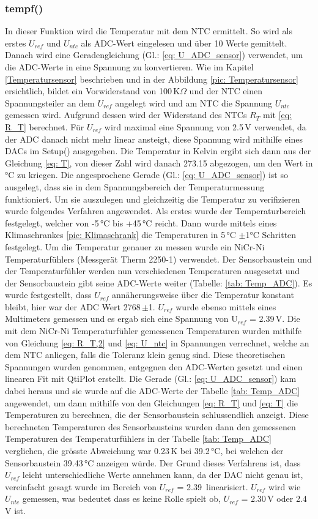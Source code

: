 \subsubsection{tempf()} \label{tempf}
In dieser Funktion wird die Temperatur mit dem NTC ermittelt. So wird als erstes $U_{ref}$ und $U_{ntc}$ als ADC-Wert eingelesen und über 10 Werte gemittelt. Danach wird eine Geradengleichung (Gl.: \ref{eq: U_ADC_sensor}) verwendet, um die ADC-Werte in eine Spannung zu konvertieren. Wie im Kapitel \ref{Temperatursensor} beschrieben und in der Abbildung \ref{pic: Temperatursensor} ersichtlich, bildet ein Vorwiderstand von 100\,K$\Omega$ und der NTC einen Spannungsteiler an dem $U_{ref}$ angelegt wird und am NTC die Spannung $U_{ntc}$ gemessen wird. Aufgrund dessen wird der Widerstand des NTCs $R_T$ mit \ref{eq: R_T} berechnet. Für $U_{ref}$ wird maximal eine Spannung von 2.5\,V verwendet, da der ADC danach nicht mehr linear ansteigt, diese Spannung wird mithilfe eines DACs im Setup() ausgegeben. Die Temperatur in Kelvin ergibt sich dann aus der Gleichung \ref{eq: T}, von dieser Zahl wird danach 273.15 abgezogen, um den Wert in °C zu kriegen. Die angesprochene Gerade (Gl.: \ref{eq: U_ADC_sensor}) ist so ausgelegt, dass sie in dem Spannungsbereich der Temperaturmessung funktioniert. Um sie auszulegen und gleichzeitig die Temperatur zu verifizieren wurde folgendes Verfahren angewendet. Als erstes wurde der Temperaturbereich festgelegt, welcher von -5\,°C bis +45\,°C reicht. Dann wurde mittels eines Klimaschrankes \ref{pic: Klimaschrank} die Temperaturen in 5\,°C $\pm$1°C Schritten festgelegt. Um die Temperatur genauer zu messen wurde ein NiCr-Ni Temperaturfühlers (Messgerät Therm 2250-1) verwendet. Der Sensorbaustein und der Temperaturfühler werden nun verschiedenen Temperaturen ausgesetzt und der Sensorbaustein gibt seine ADC-Werte weiter (Tabelle: \ref{tab: Temp_ADC}). Es wurde festgestellt, dass $U_{ref}$ annäherungsweise über die Temperatur konstant bleibt, hier war der ADC Wert 2768\,$\pm$1. $U_{ref}$ wurde ebenso mittels eines Multimeters gemessen und es ergab sich eine Spannung von U$_{ref}$ = 2.39\,V. Die mit dem NiCr-Ni Temperaturfühler gemessenen Temperaturen wurden mithilfe von Gleichung \ref{eq: R_T,2} und \ref{eq: U_ntc} in Spannungen verrechnet, welche an dem NTC anliegen, falls die Toleranz klein genug sind. Diese theoretischen Spannungen wurden genommen, entgegnen den ADC-Werten gesetzt und einen linearen Fit mit QtiPlot erstellt. Die Gerade (Gl.: \ref{eq: U_ADC_sensor}) kam dabei heraus und sie wurde auf die ADC-Werte der Tabelle \ref{tab: Temp_ADC} angewendet, um dann mithilfe von den Gleichungen \ref{eq: R_T} und \ref{eq: T} die Temperaturen zu berechnen, die der Sensorbaustein schlussendlich anzeigt. Diese berechneten Temperaturen des Sensorbausteins wurden dann den gemessenen Temperaturen des Temperaturfühlers in der Tabelle \ref{tab: Temp_ADC} verglichen, die grösste Abweichung war 0.23\,K bei 39.2\,°C, bei welchen der Sensorbaustein 39.43\,°C anzeigen würde. Der Grund dieses Verfahrens ist, dass $U_{ref}$ leicht unterschiedliche Werte annehmen kann, da der DAC nicht genau ist, vereinfacht gesagt wurde im Bereich von $U_{ref}$ = 2.39\, linearisiert. $U_{ref}$ wird wie $U_{ntc}$ gemessen, was bedeutet dass es keine Rolle spielt ob, $U_{ref}$ = 2.30\,V oder 2.4\,V ist.
